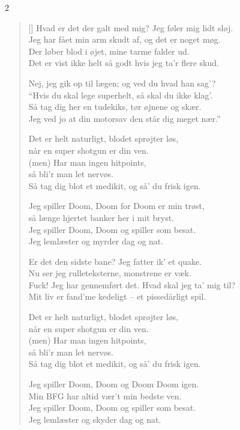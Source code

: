 {\setlength{\columnsep}{15pt}
\begin{multicols}2
\settowidth{\versewidth}{Jeg ved jo at din motorsav den står dig meget nær}%
\begin{verse}[\versewidth]
Hvad er det der galt med mig? Jeg føler mig lidt sløj.\\
Jeg har fået min arm skudt af, og det er noget møg.\\
Der løber blod i øjet, mine tarme falder ud.\\
Det er vist ikke helt så godt hvis jeg ta'r flere skud.

Nej, jeg gik op til lægen; og ved du hvad han sag'?\\
``Hvis du skal lege superhelt, så skal du ikke klag'.\\
Så tag dig her en tudekiks, tør øjnene og skær.\\
Jeg ved jo at din motorsav den står dig meget nær.''

Det er helt naturligt, blodet sprøjter løs,\\
når en super shotgun er din ven.\\
(men) Har man ingen hitpoints,\\
så bli'r man let nervøs.\\
Så tag dig blot et medikit, og så' du frisk igen.

Jeg spiller Doom, Doom for Doom er min trøst,\\
så længe hjertet banker her i mit bryst.\\
Jeg spiller Doom, Doom og spiller som besat.\\
Jeg lemlæster og myrder dag og nat.

\columnbreak

Er det den sidste bane? Jeg fatter ik' et quake.\\
Nu ser jeg rulleteksterne, monstrene er væk.\\
Fuck! Jeg har gennemført det. Hvad skal jeg ta' mig til?\\
Mit liv er fand'me kedeligt -- et pissedårligt spil.

Det er helt naturligt, blodet sprøjter løs,\\
når en super shotgun er din ven.\\
(men) Har man ingen hitpoints,\\
så bli'r man let nervøs.\\
Så tag dig blot et medikit, og så' du frisk igen.

Jeg spiller Doom, Doom og Doom Doom igen.\\
Min BFG har altid vær't min bedste ven.\\
Jeg spiller Doom, Doom og spiller som besat.\\
Jeg lemlæster og skyder dag og nat.


\end{verse}
\end{multicols}}
